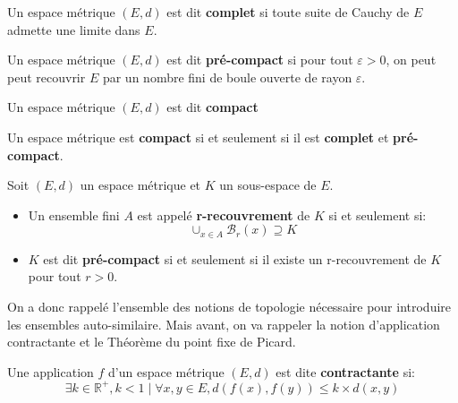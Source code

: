 \documentclass[a4paper, 12pt]{report}
\begin{document}
			\begin{definition}
				Un espace métrique $(E,d)$ est dit \textbf{complet} si toute suite de Cauchy de $E$ admette une limite dans $E$.
				\label{espMetriqueDef}
			\end{definition}
			
			\begin{definition}
				Un espace métrique $(E,d)$ est dit \textbf{pré-compact} si pour tout $\varepsilon >0$, on peut peut recouvrir $E$ par un nombre fini de boule ouverte de rayon $\varepsilon$.
			\end{definition}
			
			\begin{definition}
				Un espace métrique $(E,d)$ est dit \textbf{compact} 
			\end{definition}
			
			\begin{prop}
				Un espace métrique est \textbf{compact} si et seulement si il est \textbf{complet} et \textbf{pré-compact}.
			\end{prop}
			
			\begin{definition}
				Soit $(E,d)$ un espace métrique et $K$ un sous-espace de $E$.
				\begin{itemize}
					\item Un ensemble fini $A$ est appelé \textbf{r-recouvrement} de $K$ si et seulement si:
					\begin{equation*}
						\cup_{x\in A} \mathcal{B}_r(x)\supseteq K
					\end{equation*}
					\item $K$ est dit \textbf{pré-compact} si et seulement si il existe un r-recouvrement de $K$ pour tout $r>0$.

				\end{itemize}

			\end{definition}

			\hspace{.7 cm} On a donc rappelé l'ensemble des notions de topologie nécessaire pour introduire les ensembles auto-similaire. Mais avant, on va rappeler la notion d'application contractante et le Théorème du point fixe de Picard.
			
			\begin{definition}
				Une application $f$ d'un espace métrique $(E,d)$ est dite \textbf{contractante} si:
				\begin{equation}
					\exists k\in\mathds{R}^+, k<1 \mid \forall x,y\in E, d(f(x),f(y))\leqslant k\times d(x,y)
					\label{Pcontractante}
				\end{equation}
			\end{definition}
			
\end{document}
